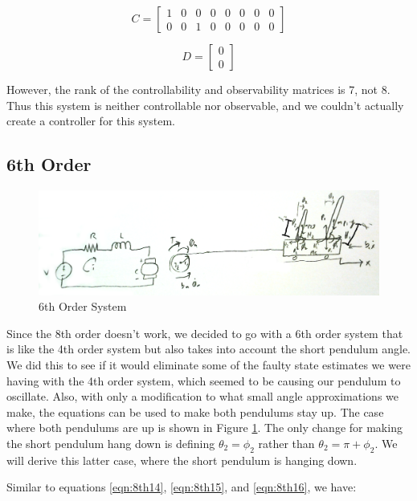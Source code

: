 \documentclass{article}
\begin{document}
\begin{equation*}
C = \begin{bmatrix}
1 & 0 & 0 & 0 & 0 & 0 & 0 & 0 \\
0 & 0 & 1 & 0 & 0 & 0 & 0 & 0
\end{bmatrix}
\end{equation*}

\begin{equation*}
D = \begin{bmatrix}
0 \\
0
\end{bmatrix}
\end{equation*}

However, the rank of the controllability and observability matrices is 7, not 8. Thus this system is neither controllable nor observable, and we couldn't actually create a controller for this system.

\subsection{6th Order}
\begin{figure}[!htb]
\centering
\includegraphics[width=0.95\linewidth]{System6thOrder}
\caption{6th Order System}
\label{fig:6thOrder}
\end{figure}

Since the 8th order doesn't work, we decided to go with a 6th order system that is like the 4th order system but also takes into account the short pendulum angle. We did this to see if it would eliminate some of the faulty state estimates we were having with the 4th order system, which seemed to be causing our pendulum to oscillate. Also, with only a modification to what small angle approximations we make, the equations can be used to make both pendulums stay up. The case where both pendulums are up is shown in Figure \ref{fig:6thOrder}. The only change for making the short pendulum hang down is defining $\theta_2 = \phi_2$ rather than $\theta_2 = \pi + \phi_2$. We will derive this latter case, where the short pendulum is hanging down.

Similar to equations \ref{eqn:8th14}, \ref{eqn:8th15}, and \ref{eqn:8th16}, we have:
\end{document}
